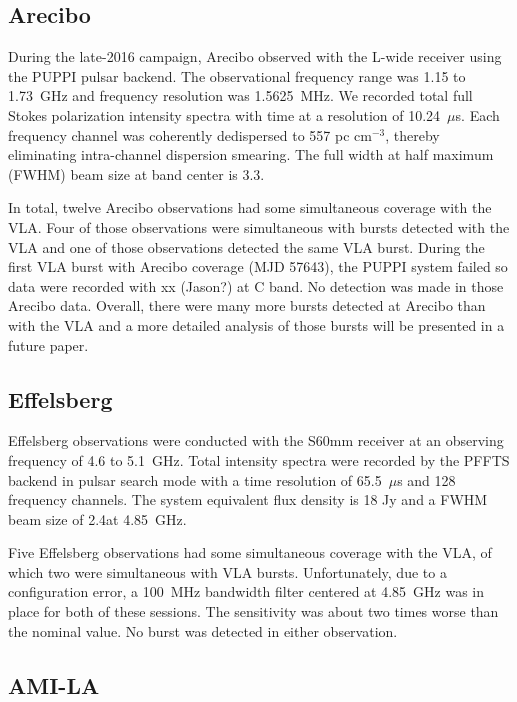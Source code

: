 \documentclass[twocolumn]{aastex61}
\begin{document}
\subsection{Arecibo}

During the late-2016 campaign, Arecibo observed with the L-wide receiver using the PUPPI pulsar backend. The observational frequency range was 1.15 to 1.73~GHz and frequency resolution was 1.5625~MHz. We recorded total full Stokes polarization intensity spectra with time at a resolution of 10.24~$\mu$s. Each frequency channel was coherently dedispersed to 557 pc cm$^{-3}$, thereby eliminating intra-channel dispersion smearing. The full width at half maximum (FWHM) beam size at band center is 3.3\arcmin.

In total, twelve Arecibo observations had some simultaneous coverage with the VLA. Four of those observations were simultaneous with bursts detected with the VLA and one of those observations detected the same VLA burst. During the first VLA burst with Arecibo coverage (MJD 57643), the PUPPI system failed so data were recorded with {\color{red} xx (Jason?)} at C band. No detection was made in those Arecibo data. Overall, there were many more bursts detected at Arecibo than with the VLA and a more detailed analysis of those bursts will be presented in a future paper.

\subsection{Effelsberg}

Effelsberg observations were conducted with the S60mm receiver at an observing frequency of 4.6 to 5.1~GHz. Total intensity spectra were recorded by the PFFTS backend in pulsar search mode with a time resolution of 65.5~$\mu$s and 128 frequency channels. The system equivalent flux density is 18 Jy and a FWHM beam size of 2.4\arcmin at 4.85~GHz. 

Five Effelsberg observations had some simultaneous coverage with the VLA, of which two were simultaneous with VLA bursts. Unfortunately, due to a configuration error, a 100~MHz bandwidth filter centered at 4.85~GHz was in place for both of these sessions. The sensitivity was about two times worse than the nominal value. No burst was detected in either observation.

\subsection{AMI-LA}
\end{document}
